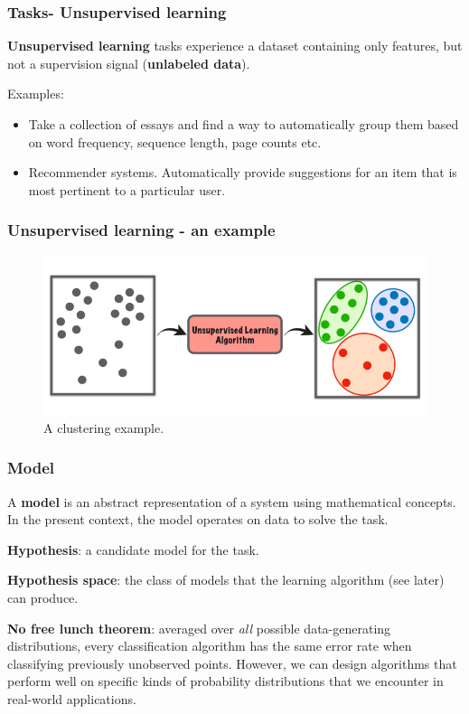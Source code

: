 \documentclass{beamer}
\begin{document}
	\begin{frame}
		\frametitle{Tasks- Unsupervised learning}
		\textbf{Unsupervised learning} tasks experience a dataset containing only features, but not a supervision signal (\textbf{unlabeled data}). %
		
		Examples:
		\begin{itemize}
			\item Take a collection of essays and find a way to automatically group them based on word frequency, sequence length, page counts etc.
			\item Recommender systems. Automatically provide suggestions for an item
			that is most pertinent to a particular user.
		\end{itemize} 
		
	\end{frame}

	\begin{frame}
		\frametitle{Unsupervised learning - an example}
		\begin{figure}
			\centering
			\includegraphics[scale=0.35]{images/unsupervised-learning}
			\caption{A clustering example.}
		\end{figure}
	\end{frame}

	\begin{frame}
		\frametitle{Model}
		
		A \textbf{model} is an abstract representation of a system using mathematical concepts. In the present context, the model operates on data to solve the task.
		
		\vspace{5mm}
		
		\textbf{Hypothesis}: a candidate model for the task.
		
		\textbf{Hypothesis space}: the class of models that the learning algorithm (see later) can produce.
		
		\vspace{5mm}
		
		\textbf{No free lunch theorem}: averaged over \textit{all} possible data-generating distributions, every classification algorithm has the same error rate when classifying previously unobserved points. However, we can design algorithms that perform well on specific kinds of probability distributions that we encounter in real-world applications.
		\end{frame}
\end{document}
